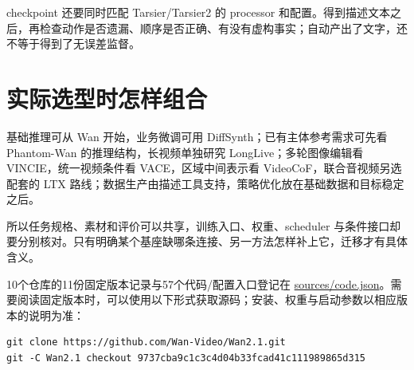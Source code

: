 checkpoint 还要同时匹配 Tarsier/Tarsier2 的 processor 和配置。得到描述文本之后，再检查动作是否遗漏、顺序是否正确、有没有虚构事实；自动产出了文字，还不等于得到了无误差监督。

\section{实际选型时怎样组合}\label{seedance-m15-ux5b9eux9645ux9009ux578bux65f6ux600eux6837ux7ec4ux5408}

基础推理可从 Wan 开始，业务微调可用 DiffSynth；已有主体参考需求可先看 Phantom-Wan 的推理结构，长视频单独研究 LongLive；多轮图像编辑看 VINCIE，统一视频条件看 VACE，区域中间表示看 VideoCoF，联合音视频另选配套的 LTX 路线；数据生产由描述工具支持，策略优化放在基础数据和目标稳定之后。

所以任务规格、素材和评价可以共享，训练入口、权重、scheduler 与条件接口却要分别核对。只有明确某个基座缺哪条连接、另一方法怎样补上它，迁移才有具体含义。

10个仓库的11份固定版本记录与57个代码/配置入口登记在 \href{https://github.com/foocker/multimodal-journey/blob/0f1b6bb86d609d75d8c2582063d85707d0180d39/sources/code.json}{sources/code.json}。需要阅读固定版本时，可以使用以下形式获取源码；安装、权重与启动参数以相应版本的说明为准：

\begin{verbatim}
git clone https://github.com/Wan-Video/Wan2.1.git
git -C Wan2.1 checkout 9737cba9c1c3c4d04b33fcad41c111989865d315
\end{verbatim}
